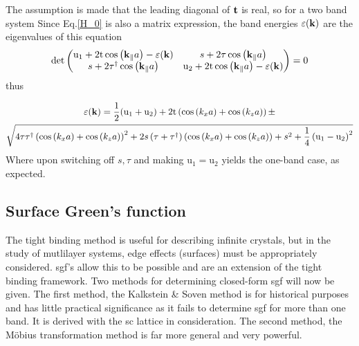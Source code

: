 \documentclass[a4paper, 12pt]{article}
\begin{document}
	The assumption is made that the leading diagonal of $\bf t$ is real, so for a two band system
	Since Eq.\eqref{H_0} is also a matrix expression, the band energies $\varepsilon(\bf k)$ are the eigenvalues of this equation
	\begin{equation}
		\rm det \begin{pmatrix} \rm u_1+2t\cos \left(\bf k_\parallel{\mathnormal a} \right)-\varepsilon(\bf k) &s+2\tau
			\cos \left( {\bf k_\parallel}a \right) \\ s+2
			\tau^\dagger\cos \left({\bf k_\parallel}a \right) &\rm u_2+2t\cos \left( \bf k_\parallel {\mathnormal a}
\right)-\varepsilon(\bf k) \end{pmatrix} =0
	\end{equation}
	thus

	\begin{multline}
		\varepsilon({\bf k}) =\frac{1}{2}({\rm u}_1+{\rm u}_2)+2{\rm t}\left(\cos \left( k_x a \right)+ \cos \left( k_z a \right) \right)
 \pm \\\sqrt{ 4 \tau\tau^\dagger\left(\cos \left( k_x a \right) +\cos \left( k_z a \right)\right)^2
 +2{\mathnormal s}\left(\tau+\tau^\dagger\right)
 \left(\cos \left( k_x a \right)+\cos \left( k_z a \right)\right) +s^2+\frac{1}{4}\left({\rm u}_1 -{\rm u}_2\right)^2}
	\end{multline}
	Where upon switching off $s, \tau$ and making u$_1 = $u$_2$ yields the one-band case, as expected.
	

	\subsection{Surface Green's function}
	The tight binding method is useful for describing infinite crystals, but in the study of mutlilayer systems, edge effects (surfaces) must be appropriately considered.
	\gls{sgf}'s allow this to be possible and are an extension of the tight binding framework.
	Two methods for determining closed-form \gls{sgf} will now be given. The first method, the Kalkstein \& Soven method is for historical purposes and has little practical significance as it fails to determine \gls{sgf} for more than one band. It is derived with the \gls{sc} lattice in consideration. The second method, the M\"{o}bius transformation method is far more general and very powerful.
\end{document}
